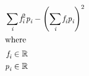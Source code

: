\documentclass[12pt]{article}
\begin{document}
\begin{center}
\resizebox{\textwidth}{!} 
{
\begin{minipage}[c]{\textwidth}
\begin{align*}
 \omit \span \sum_\textit{i} \textit{f}_{ \textit{i} }^{2}\textit{p}_{ \textit{i} } - \left( \sum_\textit{i} \textit{f}_{ \textit{i} }\textit{p}_{ \textit{i} } \right)^{2} \\
\intertext{where} 
\textit{f}_{\textit{i}} & \in \mathbb{R} \\
\textit{p}_{\textit{i}} & \in \mathbb{R} \\
\\
\end{align*}
\end{minipage}
}
\end{center}
\end{document}
